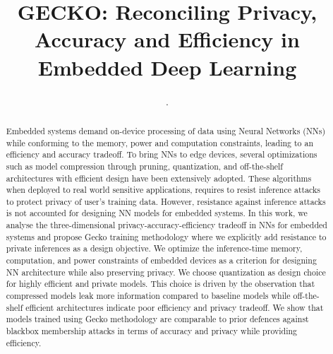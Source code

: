 \documentclass[sigconf]{acmart}
\begin{document}
\title{GECKO: Reconciling Privacy, Accuracy and Efficiency in Embedded Deep Learning}

\author{.}


\begin{abstract}

Embedded systems demand on-device processing of data using Neural Networks (NNs) while conforming to the memory, power and computation constraints, leading to an efficiency and accuracy tradeoff. To bring NNs to edge devices, several optimizations such as model compression through pruning, quantization, and off-the-shelf architectures with efficient design have been extensively adopted. These algorithms when deployed to real world sensitive applications, requires to resist inference attacks to protect privacy of user’s training data. However, resistance against inference attacks is not accounted for designing NN models for embedded systems. In this work, we analyse the three-dimensional privacy-accuracy-efficiency tradeoff in NNs for embedded systems and propose Gecko training methodology where we explicitly add resistance to private inferences as a design objective. 
We optimize the inference-time memory, computation, and power constraints of embedded devices as a criterion for designing NN architecture while also preserving privacy. 
We choose quantization as design choice for highly efficient and private models. This choice is driven by the observation that compressed models leak more information compared to baseline models while off-the-shelf efficient architectures indicate poor efficiency and privacy tradeoff. We show that models trained using Gecko methodology are comparable to prior defences against blackbox membership attacks in terms of accuracy and privacy while providing efficiency.



\end{abstract}
\end{document}
